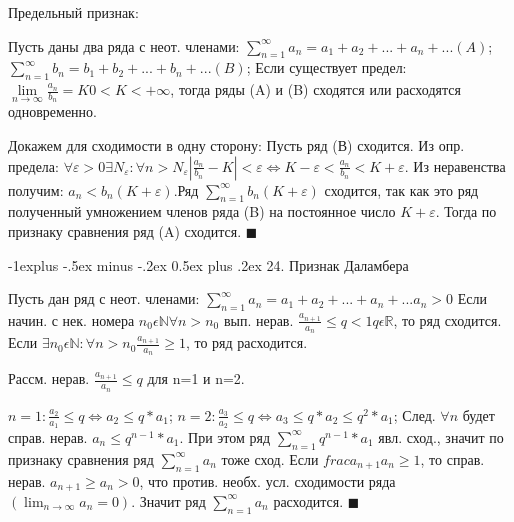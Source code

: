 \documentclass[unicode,10pt, landscape]{article}
\makeatletter
\renewcommand{\subsection}{\@startsection{subsection}{2}{0mm}%
                                {-1explus -.5ex minus -.2ex}%
                                {0.5ex plus .2ex}%
                                {\normalfont\normalsize\bfseries}}
\newenvironment{Proof} %
{\par\noindent{\bf Док-во:}} %
{\hfill$\scriptstyle\blacksquare$}
\makeatother
\begin{document}
\begin{multicols}{2}
Предельный признак:
\begin{Th}
Пусть даны два ряда с неот. членами: $\sum\limits_{n=1}^{\infty} a_{n}=a_{1}+a_{2}+...+a_{n}+...    (A)$; $\sum\limits_{n=1}^{\infty} b_{n}=b_{1}+b_{2}+...+b_{n}+...    (B)$; Если существует предел: $\lim\limits_{n\rightarrow \infty } \frac{a_{n}}{b_{n}}=K      0<K< +\infty$, тогда ряды (A) и (B) сходятся или расходятся одновременно.
\begin{Proof}
Докажем для сходимости в одну сторону: 
Пусть ряд (В) сходится. Из опр. предела: $\forall \varepsilon >0 \exists N_{\varepsilon }:\forall n>N_{\varepsilon }\left | \frac{a_{n}}{b_{n}}-K \right |<\varepsilon \Leftrightarrow K-\varepsilon <\frac{a_{n}}{b_{n}}<K+\varepsilon$. Из неравенства получим: $a_{n}<b_{n}(K+\varepsilon )$.Ряд $\sum_{n=1}^{\infty} b_{n}(K+\varepsilon )$ сходится, так как это ряд полученный умножением членов ряда (B) на постоянное число $K+\varepsilon$. Тогда по признаку сравнения ряд (A) сходится.
\end{Proof}
\end{Th}


\subsection{24. Признак Даламбера}
\begin{Th}
Пусть дан ряд с неот. членами:
$\sum\limits_{n=1}^{\infty} a_{n}=a_{1}+a_{2}+...+a_{n}+...
a_{n}>0$
Если начин. с нек. номера $n_{0}\epsilon \mathbb{N} \forall n>n_{0}$ вып. нерав. $\frac{a_{n+1}}{a_{n}}\leq q<1 q\epsilon \mathbb{R}$, то ряд сходится.
Если $\exists n_{0}\epsilon \mathbb{N}:\forall n>n_{0} \frac{a_{n+1}}{a_{n}}\geq 1$, то ряд расходится.
\begin{Proof}
Рассм. нерав. $\frac{a_{n+1}}{a_{n}}\leq q$ для n=1 и n=2.

$n=1:\frac{a_{2}}{a_{1}}\leq q\Leftrightarrow a_{2}\leq q*a_{1}$; 
$n=2:\frac{a_{3}}{a_{2}}\leq q\Leftrightarrow a_{3}\leq q*a_{2}\leq q^{2}*a_{1}$; 
След. $\forall n$ будет справ. нерав. $a_{n}\leq q^{n-1}*a_{1}$. При этом ряд $\sum_{n=1}^{\infty} q^{n-1}*a_{1}$ явл. сход., значит по признаку сравнения ряд $\sum_{n=1}^{\infty} a_{n}$ тоже сход.
Если $frac{a_{n+1}}{a_{n}}\geq 1$, то справ. нерав. $a_{n+1}\geq a_{n}>0$, что против. необх. усл. сходимости ряда $(\lim_{n\rightarrow \infty }a_{n}=0)$. Значит ряд $\sum_{n=1}^{\infty} a_{n}$ расходится.
\end{Proof}
\end{Th}


\end{multicols}
\end{document}
